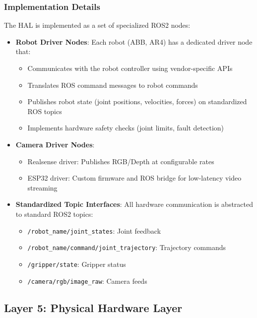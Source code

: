 \subsubsection{Implementation Details}

The HAL is implemented as a set of specialized ROS2 nodes:

\begin{itemize}
    \item \textbf{Robot Driver Nodes}: Each robot (ABB, AR4) has a dedicated driver node that:
    \begin{itemize}
        \item Communicates with the robot controller using vendor-specific APIs
        \item Translates ROS command messages to robot commands
        \item Publishes robot state (joint positions, velocities, forces) on standardized ROS topics
        \item Implements hardware safety checks (joint limits, fault detection)
    \end{itemize}
    
    \item \textbf{Camera Driver Nodes}: 
    \begin{itemize}
        \item Realsense driver: Publishes RGB/Depth at configurable rates
        \item ESP32 driver: Custom firmware and ROS bridge for low-latency video streaming
    \end{itemize}
    
    \item \textbf{Standardized Topic Interfaces}: All hardware communication is abstracted to standard ROS2 topics:
    \begin{itemize}
        \item \texttt{/robot\_name/joint\_states}: Joint feedback
        \item \texttt{/robot\_name/command/joint\_trajectory}: Trajectory commands
        \item \texttt{/gripper/state}: Gripper status
        \item \texttt{/camera/rgb/image\_raw}: Camera feeds
    \end{itemize}
\end{itemize}

\subsection{Layer 5: Physical Hardware Layer}
\label{subsec:physical_hardware_layer}

